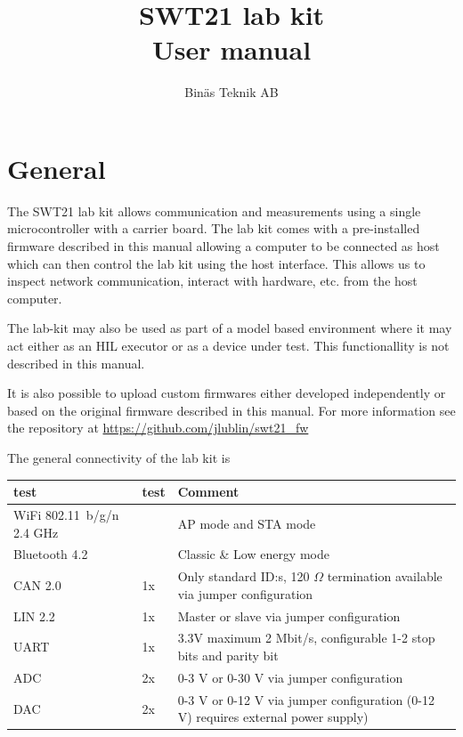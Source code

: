 \documentclass{article}[a4paper]
\title{SWT21 lab kit \\ User manual}
\author{Binäs Teknik AB}
\begin{document}
\maketitle
\tableofcontents
\newpage

\section{General}

The SWT21 lab kit allows communication and measurements using a single
microcontroller with a carrier board. The lab kit comes with a pre-installed
firmware described in this manual allowing a
computer to be connected as host which can then control the lab kit using the
host interface. This allows us to inspect network communication, interact with
hardware, etc. from the host computer.

The lab-kit may also be used as part of a model based environment where it may
act either as an HIL executor or as a device under test. This functionallity is
not described in this manual.

It is also possible to upload custom firmwares either developed independently or
based on the original firmware described in this manual. For more information
see the repository at \url{https://github.com/jlublin/swt21_fw}

The general connectivity of the lab kit is

\medskip
\renewcommand{\arraystretch}{1.5}
\noindent
\begin{tabularx}{\textwidth}{|p{2cm}|p{1.5cm}|X|}
\hline
test & test & Comment \\
\hline
WiFi \hbox{802.11 b/g/n} 2.4 GHz &  & AP mode and STA mode \\
\hline
Bluetooth 4.2 & &  Classic \& Low energy mode \\
\hline
CAN 2.0 & 1x & Only standard ID:s, 120 $\Omega$ termination available via jumper
 configuration \\
\hline
LIN 2.2 & 1x & Master or slave via jumper configuration \\
\hline
UART & 1x & 3.3V maximum 2 Mbit/s, configurable 1-2 stop bits and parity bit \\
\hline
ADC & 2x & 0-3 V or 0-30 V via jumper configuration \\
\hline
DAC & 2x & 0-3 V or 0-12 V via jumper configuration (0-12 V) requires external power supply)\\
\hline
\end{tabularx}
\end{document}
